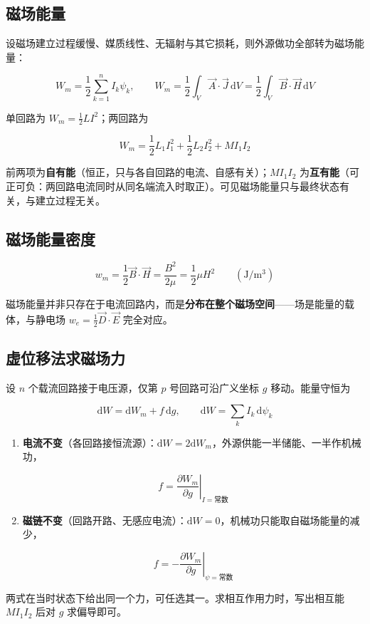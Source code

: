 \subsection{磁场能量}
设磁场建立过程缓慢、媒质线性、无辐射与其它损耗，则外源做功全部转为磁场能量：
\begin{formulaBox}
\[
W_m=\frac12\sum_{k=1}^{n}I_k\psi_k,
\qquad
W_m=\frac12\int_V\vec{A}\cdot\vec{J}\,\mathrm{d}V
=\frac12\int_V\vec{B}\cdot\vec{H}\,\mathrm{d}V
\]
\end{formulaBox}
单回路为 $W_m=\frac12LI^2$；两回路为
\begin{formulaBox}
\[
W_m=\frac12L_1I_1^2+\frac12L_2I_2^2+MI_1I_2
\]
\end{formulaBox}
前两项为\textbf{自有能}（恒正，只与各自回路的电流、自感有关）；$MI_1I_2$ 为\textbf{互有能}（可正可负：两回路电流同时从同名端流入时取正）。可见磁场能量只与最终状态有关，与建立过程无关。

\subsection{磁场能量密度}
\begin{formulaBox}
\[
w_m=\frac12\vec{B}\cdot\vec{H}=\frac{B^2}{2\mu}=\frac12\mu H^2
\qquad(\mathrm{J/m^3})
\]
\end{formulaBox}
磁场能量并非只存在于电流回路内，而是\textbf{分布在整个磁场空间}——场是能量的载体，与静电场 $w_e=\frac12\vec{D}\cdot\vec{E}$ 完全对应。

\subsection{虚位移法求磁场力}
设 $n$ 个载流回路接于电压源，仅第 $p$ 号回路可沿广义坐标 $g$ 移动。能量守恒为
\begin{formulaBox}
\[
\mathrm{d}W=\mathrm{d}W_m+f\,\mathrm{d}g,
\qquad
\mathrm{d}W=\sum_k I_k\,\mathrm{d}\psi_k
\]
\end{formulaBox}
\begin{enumerate}
  \item \textbf{电流不变}（各回路接恒流源）：$\mathrm{d}W=2\mathrm{d}W_m$，外源供能一半储能、一半作机械功，
  \begin{formulaBox}
  \[
  f=\left.\frac{\partial W_m}{\partial g}\right|_{I=\text{常数}}
  \]
  \end{formulaBox}
  \item \textbf{磁链不变}（回路开路、无感应电流）：$\mathrm{d}W=0$，机械功只能取自磁场能量的减少，
  \begin{formulaBox}
  \[
  f=-\left.\frac{\partial W_m}{\partial g}\right|_{\psi=\text{常数}}
  \]
  \end{formulaBox}
\end{enumerate}
两式在当时状态下给出同一个力，可任选其一。求相互作用力时，写出相互能 $MI_1I_2$ 后对 $g$ 求偏导即可。

